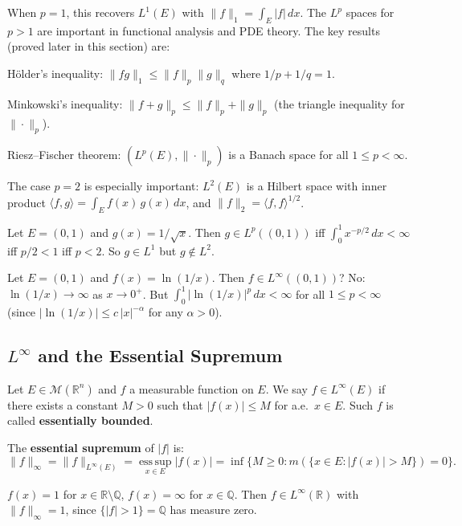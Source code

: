 \documentclass[11pt]{report}
\begin{document}
\begin{rembox}
When $p = 1$, this recovers $L^1(E)$ with $\|f\|_1 = \int_E |f|\,dx$. The $L^p$ spaces for $p > 1$ are important in functional analysis and PDE theory. The key results (proved later in this section) are:

H\"older's inequality: $\|fg\|_1 \leq \|f\|_p \|g\|_q$ where $1/p + 1/q = 1$.

Minkowski's inequality: $\|f + g\|_p \leq \|f\|_p + \|g\|_p$ (the triangle inequality for $\|\cdot\|_p$).

Riesz--Fischer theorem: $(L^p(E), \|\cdot\|_p)$ is a Banach space for all $1 \leq p < \infty$.

The case $p = 2$ is especially important: $L^2(E)$ is a Hilbert space with inner product $\langle f, g \rangle = \int_E f(x)\,g(x)\,dx$, and $\|f\|_2 = \langle f, f \rangle^{1/2}$.
\end{rembox}

\begin{exbox}
Let $E = (0, 1)$ and $g(x) = 1/\sqrt{x}$. Then $g \in L^p((0,1))$ iff $\int_0^1 x^{-p/2}\,dx < \infty$ iff $p/2 < 1$ iff $p < 2$. So $g \in L^1$ but $g \notin L^2$.

Let $E = (0, 1)$ and $f(x) = \ln(1/x)$. Then $f \in L^\infty((0,1))$? No: $\ln(1/x) \to \infty$ as $x \to 0^+$. But $\int_0^1 |\ln(1/x)|^p\,dx < \infty$ for all $1 \leq p < \infty$ (since $|\ln(1/x)| \leq c\,|x|^{-\alpha}$ for any $\alpha > 0$).
\end{exbox}

\subsection{$L^\infty$ and the Essential Supremum}

\begin{defbox}
Let $E \in \mathcal{M}(\mathbb{R}^n)$ and $f$ a measurable function on $E$. We say $f \in L^\infty(E)$ if there exists a constant $M > 0$ such that $|f(x)| \leq M$ for a.e.\ $x \in E$. Such $f$ is called \textbf{essentially bounded}.

The \textbf{essential supremum} of $|f|$ is:
\[
\|f\|_\infty = \|f\|_{L^\infty(E)} = \operatorname*{ess\,sup}_{x \in E} |f(x)| = \inf\{M \geq 0 : m(\{x \in E : |f(x)| > M\}) = 0\}.
\]
\end{defbox}

\begin{exbox}
$f(x) = 1$ for $x \in \mathbb{R} \setminus \mathbb{Q}$, $f(x) = \infty$ for $x \in \mathbb{Q}$. Then $f \in L^\infty(\mathbb{R})$ with $\|f\|_\infty = 1$, since $\{|f| > 1\} = \mathbb{Q}$ has measure zero.
\end{exbox}
\end{document}
